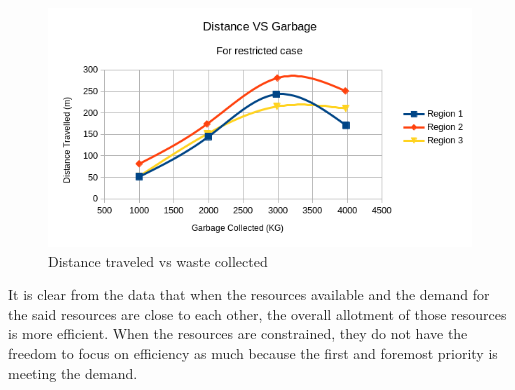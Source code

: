 \documentclass[12pt]{article}
\begin{document}
\begin{figure}[H]
    \centering
    \includegraphics[scale=0.8]{distance_VS_garbage_restricted.png}
    \caption{Distance traveled vs waste collected}\label{figz}
\end{figure}

It is clear from the data that when the resources available and the demand for the said resources are close to each other, the overall allotment of those resources is more efficient. When the resources are constrained, they do not have the freedom to focus on efficiency as much because the first and foremost priority is meeting the demand.
\end{document}
